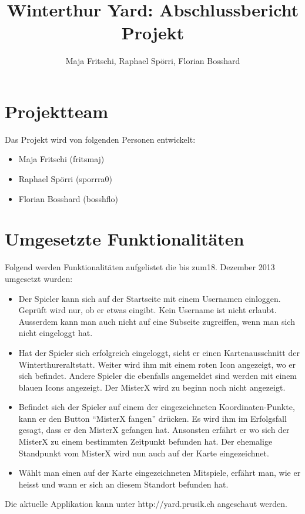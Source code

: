\documentclass[11pt]{article}
\title{Winterthur Yard: Abschlussbericht Projekt}
\author{Maja Fritschi, Raphael Spörri, Florian Bosshard}
\date{}
\begin{document}
\maketitle

\tableofcontents
\newpage

\section{Projektteam}
Das Projekt wird von folgenden Personen entwickelt:
\begin{itemize}
\item Maja Fritschi (fritsmaj)
\item Raphael Spörri (sporrra0)
\item Florian Bosshard (bosshflo)
\end{itemize}


\section{Umgesetzte Funktionalitäten}
Folgend werden Funktionalitäten aufgelistet die bis zum18. Dezember 2013 umgesetzt wurden: 
\begin{itemize}
\item Der Spieler kann sich auf der Startseite mit einem Usernamen einloggen. Geprüft wird nur, ob er etwas eingibt. Kein Username ist nicht erlaubt. Ausserdem kann man auch nicht auf eine Subseite zugreiffen, wenn man sich nicht eingeloggt hat.
\item Hat der Spieler sich erfolgreich eingeloggt, sieht er einen  Kartenausschnitt der Winterthureraltstatt. Weiter wird ihm mit einem roten Icon angezeigt, wo er sich befindet. Andere Spieler die ebenfalls angemeldet sind werden mit einem blauen Icons angezeigt. Der MisterX wird zu beginn noch nicht angezeigt.
\item Befindet sich der Spieler auf einem der eingezeichneten Koordinaten-Punkte, kann er den Button ``MisterX fangen'' drücken. Es wird ihm im Erfolgsfall gesagt, dass er den MisterX gefangen hat.  Ansonsten erfährt er wo sich der MisterX zu einem bestimmten Zeitpunkt befunden hat. Der ehemalige Standpunkt vom MisterX wird nun auch auf der Karte eingezeichnet. 
\item Wählt man einen auf der Karte eingezeichneten Mitspiele, erfährt man, wie er heisst und wann er sich an diesem Standort befunden hat.
\end{itemize}

Die aktuelle Applikation kann unter http://yard.prusik.ch angeschaut werden. 
\end{document}
